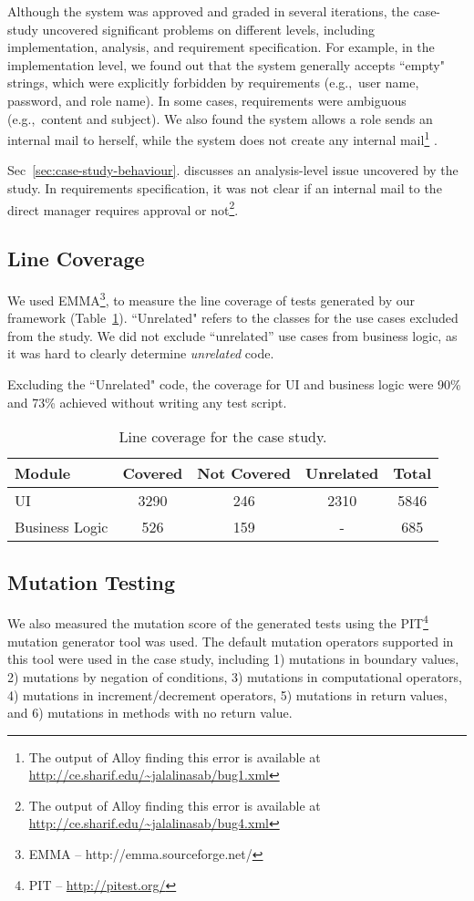 Although the system was approved and graded in several iterations, the case-study uncovered significant problems on different levels, including implementation, analysis, and requirement specification. For example, in the implementation level, we found out that the system generally accepts ``empty" strings, which were explicitly forbidden by requirements (e.g.,\ user name, password, and role name).  In some cases, requirements were ambiguous (e.g.,\ content and subject). We also found  the system allows a role sends an internal mail to herself, while the system does not create any internal mail\footnote{The output of Alloy finding this error is available at \url{http://ce.sharif.edu/~jalalinasab/bug1.xml}} .

Sec~\ref{sec:case-study-behaviour}. discusses an analysis-level issue uncovered by the study. In requirements specification, it was not clear if an internal mail to the direct manager requires approval or not\footnote{The output of Alloy finding this error is available at \url{http://ce.sharif.edu/~jalalinasab/bug4.xml}}. 

\subsection{Line Coverage}
\label{sec:case-study-line-coverage}
We used EMMA\footnote{EMMA – http://emma.sourceforge.net/}, to measure the line coverage of tests generated by our framework (Table~\ref{tbl:case-study-coverage}). ``Unrelated" refers to the classes for the use cases excluded from the study. We did not exclude ``unrelated'' use cases from business logic, as it was hard to clearly determine \textit{unrelated} code.

Excluding the ``Unrelated" code, the coverage for UI and business logic were 90\% and 73\% achieved without writing any test script. 

\begin{table}[!t]
\caption{Line coverage for the case study.}
\label{tbl:case-study-coverage}
\centering
\begin{tabular}{|p{2cm}|c|c|c|c|}
\hline
Module & Covered & Not Covered & Unrelated & Total \\ \hline
UI & 3290 & 246 & 2310 & 5846 \\ \hline
Business Logic & 526	& 159 & - & 685 \\
\hline
\end{tabular}
\end{table}

\subsection{Mutation Testing}
\label{sec:case-study-mutation}
We also measured the mutation score of the generated tests using the PIT\footnote{PIT – \url{http://pitest.org/}} mutation generator tool was used. The default mutation operators supported in this tool were used in the case study, including 1) mutations in boundary values, 2) mutations by negation of conditions, 3) mutations in computational operators, 4) mutations in increment/decrement operators, 5) mutations in return values, and 6) mutations in methods with no return value.

